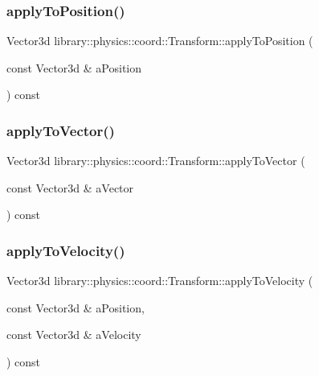 \subsubsection{\texorpdfstring{apply\+To\+Position()}{applyToPosition()}}
{\footnotesize\ttfamily Vector3d library\+::physics\+::coord\+::\+Transform\+::apply\+To\+Position (\begin{DoxyParamCaption}\item[{const Vector3d \&}]{a\+Position }\end{DoxyParamCaption}) const}

\mbox{\label{classlibrary_1_1physics_1_1coord_1_1_transform_a0709a5af7a97adbda05a24b9d4ad677d}} 
\subsubsection{\texorpdfstring{apply\+To\+Vector()}{applyToVector()}}
{\footnotesize\ttfamily Vector3d library\+::physics\+::coord\+::\+Transform\+::apply\+To\+Vector (\begin{DoxyParamCaption}\item[{const Vector3d \&}]{a\+Vector }\end{DoxyParamCaption}) const}

\mbox{\label{classlibrary_1_1physics_1_1coord_1_1_transform_a017c1ec77f5ddda3f7d93dd63a9a6d3f}} 
\subsubsection{\texorpdfstring{apply\+To\+Velocity()}{applyToVelocity()}}
{\footnotesize\ttfamily Vector3d library\+::physics\+::coord\+::\+Transform\+::apply\+To\+Velocity (\begin{DoxyParamCaption}\item[{const Vector3d \&}]{a\+Position,  }\item[{const Vector3d \&}]{a\+Velocity }\end{DoxyParamCaption}) const}

